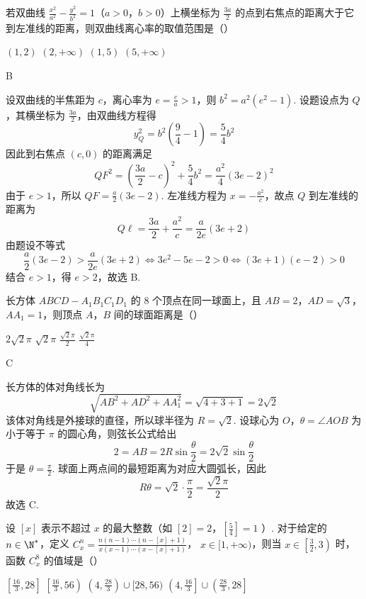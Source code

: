 \begin{problem}
若双曲线 \(\frac{x^2}{a^2} - \frac{y^2}{b^2} = 1\)（\(a > 0\)，\(b > 0\)）上横坐标为 \(\frac{3a}{2}\) 的点到右焦点的距离大于它到左准线的距离，则双曲线离心率的取值范围是（\quad）

\choices
    {\((1,2)\)}
    {\((2, +\infty)\)}
    {\((1,5)\)}
    {\((5, +\infty)\)}
\end{problem}

\begin{answer}
B
\end{answer}

\begin{solution}
设双曲线的半焦距为 \(c\)，离心率为 \(e=\frac ca>1\)，则 \(b^2=a^2(e^2-1)\). 设题设点为 \(Q\)，其横坐标为 \(\frac{3a}{2}\)，由双曲线方程得
\[
y_Q^2=b^2\left(\frac{9}{4}-1\right)=\frac54b^2
\]
因此到右焦点 \((c,0)\) 的距离满足
\[
QF^2=\left(\frac{3a}{2}-c\right)^2+\frac54b^2
=\frac{a^2}{4}(3e-2)^2
\]
由于 \(e>1\)，所以 \(QF=\frac a2(3e-2)\). 左准线方程为 \(x=-\frac{a^2}{c}\)，故点 \(Q\) 到左准线的距离为
\[
Q\ell=\frac{3a}{2}+\frac{a^2}{c}=\frac a{2e}(3e+2)
\]
由题设不等式
\[
\frac a2(3e-2)>\frac a{2e}(3e+2)
\Longleftrightarrow 3e^2-5e-2>0
\Longleftrightarrow (3e+1)(e-2)>0
\]
结合 \(e>1\)，得 \(e>2\)，故选 B.
\end{solution}

\begin{problem}
长方体 \(ABCD - A_{1}B_{1}C_{1}D_{1}\) 的 \(8\) 个顶点在同一球面上，且 \(AB = 2\)，\(AD = \sqrt{3}\)，\(AA_{1} = 1\)，则顶点 \(A\)，\(B\) 间的球面距离是（\quad）

\choices
    {\(2\sqrt{2}\pi\)}
    {\(\sqrt{2}\pi\)}
    {\(\frac{\sqrt{2}\pi}{2}\)}
    {\(\frac{\sqrt{2}\pi}{4}\)}
\end{problem}

\begin{answer}
C
\end{answer}

\begin{solution}
长方体的体对角线长为
\[
\sqrt{AB^2+AD^2+AA_1^2}=\sqrt{4+3+1}=2\sqrt2
\]
该体对角线是外接球的直径，所以球半径为 \(R=\sqrt2\). 设球心为 \(O\)，\(\theta=\angle AOB\) 为小于等于 \(\pi\) 的圆心角，则弦长公式给出
\[
2=AB=2R\sin\frac\theta2=2\sqrt2\sin\frac\theta2
\]
于是 \(\theta=\frac\pi2\). 球面上两点间的最短距离为对应大圆弧长，因此
\[
R\theta=\sqrt2\cdot\frac\pi2=\frac{\sqrt2\pi}{2}
\]
故选 C.
\end{solution}

\begin{problem}
设 \( [x] \) 表示不超过 \(x\) 的最大整数（如 \([2]=2\)，\(\left[\frac{5}{4}\right]=1\) ）. 对于给定的 \( n \in \N^{*} \)，定义 \( C_{x}^{n} = \frac{n(n-1)\cdots(n-[x]+1)}{x(x-1)\cdots(x-[x]+1)} \)， \( x \in [1, +\infty) \)，则当 \( x \in \left[\frac{3}{2}, 3\right) \) 时，函数 \( C_{x}^{8} \) 的值域是（\quad）

\choices
    {\(\left[\frac{16}{3}, 28\right]\)}
    {\(\left[\frac{16}{3}, 56\right)\)}
    {\(\left(4, \frac{28}{3}\right) \cup [28, 56)\)}
    {\(\left(4, \frac{16}{3}\right] \cup \left(\frac{28}{3}, 28\right]\)}
\end{problem}

